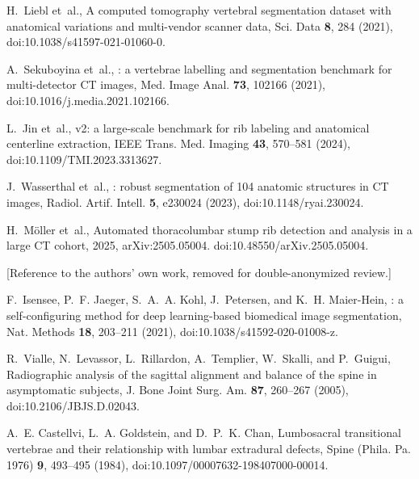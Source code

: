 \documentclass[aapm,mph,amsmath,amssymb,reprint]{revtex4-2}
\newif\ifreview \reviewtrue
\begin{document}
\begin{thebibliography}{20}
H.~Liebl et~al.,
\newblock A computed tomography vertebral segmentation dataset with anatomical variations and multi-vendor scanner data,
\newblock Sci. Data {\bf 8}, 284 (2021),
\newblock doi:10.1038/s41597-021-01060-0.

A.~Sekuboyina et~al.,
: a vertebrae labelling and segmentation benchmark for multi-detector {CT} images,
\newblock Med. Image Anal. {\bf 73}, 102166 (2021),
\newblock doi:10.1016/j.media.2021.102166.

L.~Jin et~al.,
 v2: a large-scale benchmark for rib labeling and anatomical centerline extraction,
\newblock IEEE Trans. Med. Imaging {\bf 43}, 570--581 (2024),
\newblock doi:10.1109/TMI.2023.3313627.

J.~Wasserthal et~al.,
: robust segmentation of 104 anatomic structures in {CT} images,
\newblock Radiol. Artif. Intell. {\bf 5}, e230024 (2023),
\newblock doi:10.1148/ryai.230024.

H.~M{\"o}ller et~al.,
\newblock Automated thoracolumbar stump rib detection and analysis in a large {CT} cohort, 2025,
\newblock arXiv:2505.05004. doi:10.48550/arXiv.2505.05004.

\ifreview
[Reference to the authors' own work, removed for double-anonymized review.]
\else
A.~Schehr, J.~Kim, and G.~Schwing,
\newblock {OpenSpineConsortium}: an open-source framework for medical student engagement in computational spine imaging research,
\newblock Cureus  (2026),
\newblock Published 14 July 2026. doi:10.7759/cureus.112661.
\fi

F.~Isensee, P.~F. Jaeger, S.~A.~A. Kohl, J.~Petersen, and K.~H. Maier-Hein,
: a self-configuring method for deep learning-based biomedical image segmentation,
\newblock Nat. Methods {\bf 18}, 203--211 (2021),
\newblock doi:10.1038/s41592-020-01008-z.

R.~Vialle, N.~Levassor, L.~Rillardon, A.~Templier, W.~Skalli, and P.~Guigui,
\newblock Radiographic analysis of the sagittal alignment and balance of the spine in asymptomatic subjects,
\newblock J. Bone Joint Surg. Am. {\bf 87}, 260--267 (2005),
\newblock doi:10.2106/JBJS.D.02043.

A.~E. Castellvi, L.~A. Goldstein, and D.~P.~K. Chan,
\newblock Lumbosacral transitional vertebrae and their relationship with lumbar extradural defects,
\newblock Spine (Phila. Pa. 1976) {\bf 9}, 493--495 (1984),
\newblock doi:10.1097/00007632-198407000-00014.


\end{thebibliography}
\end{document}
